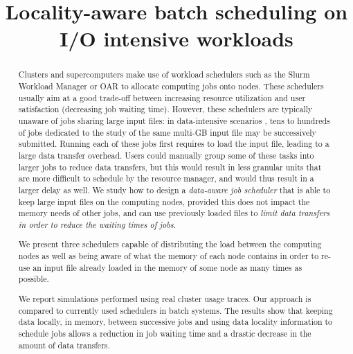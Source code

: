 \documentclass[conference,10pt]{IEEEtran}
\begin{document}
\title{Locality-aware batch scheduling on I/O intensive workloads}

\maketitle


\begin{abstract}	
  Clusters and supercomputers make use of workload schedulers such as
  the Slurm Workload Manager  or OAR to allocate computing jobs onto nodes. These schedulers
  usually aim at a good trade-off between increasing resource
  utilization and user satisfaction (decreasing job waiting
  time). However, these schedulers are typically unaware of jobs
  sharing large input files: in data-intensive scenarios , tens to
  hundreds of jobs dedicated to the study of the same multi-GB input
  file may be successively submitted. Running each of these jobs
  first requires to load the input file, leading to a large data
  transfer overhead. Users could manually group some of these
  tasks into larger jobs to reduce data transfers, but this would result in less granular units that are
  more difficult to schedule by the resource manager, and would
  thus result in a larger delay as well. We study how to design a \textit{data-aware
    job scheduler} that is able to keep large input files on the 
  computing nodes, provided this does not impact the memory needs of
  other jobs, and can use previously loaded files to \textit{limit
    data transfers in order to reduce the waiting times of jobs}.

  We present three schedulers capable of distributing the load between
  the computing nodes as well as being aware of what the memory of each
  node contains in order to re-use an input file
  already loaded in the memory of some node as many times as possible.
  
  
  We report simulations performed using real cluster usage traces. 
  Our approach is compared to currently used schedulers in batch systems.
  The results show that keeping data locally, in memory, between successive
  jobs and using data locality information to schedule jobs allows a
  reduction in job waiting time and a drastic decrease in the amount of data
  transfers.
\end{abstract}
\end{document}
